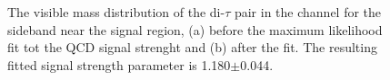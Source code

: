 \begin{figure}[h!]
\begin{center}
\end{center}
\caption{The visible mass distribution of the di-$\tau$ pair in the \mutau channel for the sideband near the signal region, (a) before
the maximum likelihood fit tot the QCD signal strenght and (b) after the fit. The resulting fitted signal strength parameter
is 1.180$\pm$0.044.}
\label{fig:mssm_qcdosss_mtnear}
\end{figure}

